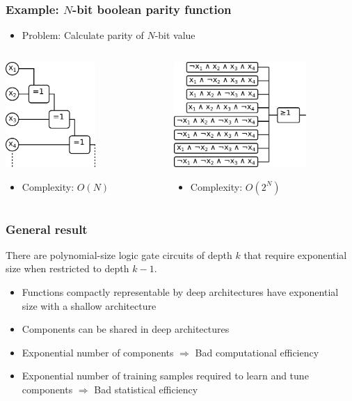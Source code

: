 \begin{frame}
	\frametitle{Example: $N$-bit boolean parity function}
	\begin{itemize}
		\item Problem: Calculate parity of $N$-bit value
	\end{itemize}
	\begin{columns}
		\begin{column}{5cm}
			\includegraphics[height=4cm]{images/daisyChainXOR.png}
			\begin{itemize}
				\item Complexity: $O(N)$
			\end{itemize}
		\end{column}
		\begin{column}{5cm}
			\includegraphics[height=4cm]{images/parityDNF.png}
			\begin{itemize}
				\item Complexity: $O(2^N)$
			\end{itemize}
		\end{column}
	\end{columns}
\end{frame}

\begin{frame}
	\frametitle{General result}
	\begin{Theorem}
		There are polynomial-size logic gate circuits of depth $k$ that require exponential size when restricted to depth $k-1$. \cite{Hastad87}
	\end{Theorem}
	\begin{itemize}
		\item Functions compactly representable by deep architectures have exponential size with a shallow architecture
		\item Components can be shared in deep architectures
		\item Exponential number of components $\Rightarrow$ Bad computational efficiency
		\item Exponential number of training samples required to learn and tune components $\Rightarrow$ Bad statistical efficiency
	\end{itemize}
\end{frame}

